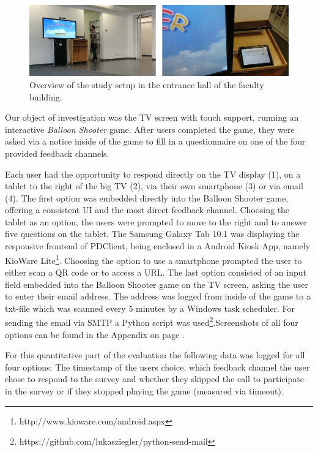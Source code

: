 		\begin{figure}
		    \begin{center}
   \includegraphics[width=\columnwidth]{img/5_field-study/study-setup.jpg}
		    \end{center}
		 \caption{Overview of the study setup in the entrance hall of the faculty building.}
		 \label{fig:5-study-setup}
		\end{figure}

		Our object of investigation was the TV screen with touch support, running an interactive \textit{Balloon Shooter} game. After users completed the game, they were asked via a notice inside of the game to fill in a questionnaire on one of the four provided feedback channels. 
		

		Each user had the opportunity to respond directly on the TV display (1), on a tablet to the right of the big TV (2), via their own smartphone (3) or via email (4). The first option was embedded directly into the Balloon Shooter game, offering a consistent UI and the most direct feedback channel. Choosing the tablet as an option, the users were prompted to move to the right and to answer five questions on the tablet. The Samsung Galaxy Tab 10.1 was displaying the responsive frontend of PDClient, being enclosed in a Android Kiosk App, namely KioWare Lite\footnote{http://www.kioware.com/android.aspx}. Choosing the option to use a smartphone prompted the user to either scan a QR code or to access a URL. The last option consisted of an input field embedded into the Balloon Shooter game on the TV screen, asking the user to enter their email address. The address was logged from inside of the game to a txt-file which was scanned every 5 minutes by a Windows task scheduler. For sending the email via SMTP a Python script was used\footnote{https://github.com/lukasziegler/python-send-mail}.Screenshots of all four options can be found in the Appendix on page \pageref{appendix:screenshots-balloon-shooter}.

		For this quantitative part of the evaluation the following data was logged for all four options: The timestamp of the users choice, which feedback channel the user chose to respond to the survey and whether they skipped the call to participate in the survey or if they stopped playing the game (measured via timeout). 


